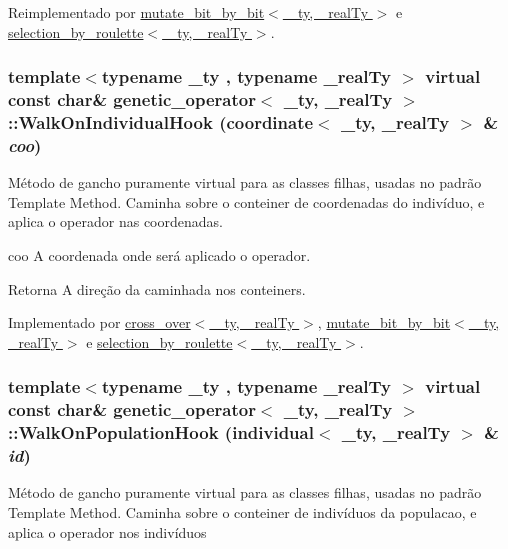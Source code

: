Reimplementado por \hyperlink{classmutate__bit__by__bit_abdab6da2a2b180f14d71f35c895313a4}{mutate\_\-bit\_\-by\_\-bit$<$ \_\-ty, \_\-realTy $>$} e \hyperlink{classselection__by__roulette_a137f1a757ab4d71a0ca0bdba7f9f35d0}{selection\_\-by\_\-roulette$<$ \_\-ty, \_\-realTy $>$}.

\hypertarget{classgenetic__operator_a2124d70b28b35d3114eb3e3ffa72baef}{
\subsubsection[{WalkOnIndividualHook}]{\setlength{\rightskip}{0pt plus 5cm}template$<$typename \_\-ty , typename \_\-realTy $>$ virtual const char\& {\bf genetic\_\-operator}$<$ \_\-ty, \_\-realTy $>$::WalkOnIndividualHook ({\bf coordinate}$<$ \_\-ty, \_\-realTy $>$ \& {\em coo})}}
\label{classgenetic__operator_a2124d70b28b35d3114eb3e3ffa72baef}
Método de gancho puramente virtual para as classes filhas, usadas no padrão Template Method. Caminha sobre o conteiner de coordenadas do indivíduo, e aplica o operador nas coordenadas.

coo A coordenada onde será aplicado o operador.

\begin{DoxyReturn}{Retorna}
A direção da caminhada nos conteiners. 
\end{DoxyReturn}


Implementado por \hyperlink{classcross__over_a1febad7c46ec396173e099372d50839e}{cross\_\-over$<$ \_\-ty, \_\-realTy $>$}, \hyperlink{classmutate__bit__by__bit_a150b01e7ee79683012f7d60e8c1b9ccc}{mutate\_\-bit\_\-by\_\-bit$<$ \_\-ty, \_\-realTy $>$} e \hyperlink{classselection__by__roulette_abb536fd7b63a452a2ebd8e7572bfc4d8}{selection\_\-by\_\-roulette$<$ \_\-ty, \_\-realTy $>$}.

\hypertarget{classgenetic__operator_a3405bb5335111bd675d408aa8db052fa}{
\subsubsection[{WalkOnPopulationHook}]{\setlength{\rightskip}{0pt plus 5cm}template$<$typename \_\-ty , typename \_\-realTy $>$ virtual const char\& {\bf genetic\_\-operator}$<$ \_\-ty, \_\-realTy $>$::WalkOnPopulationHook ({\bf individual}$<$ \_\-ty, \_\-realTy $>$ \& {\em id})}}
\label{classgenetic__operator_a3405bb5335111bd675d408aa8db052fa}
Método de gancho puramente virtual para as classes filhas, usadas no padrão Template Method. Caminha sobre o conteiner de indivíduos da populacao, e aplica o operador nos indivíduos


